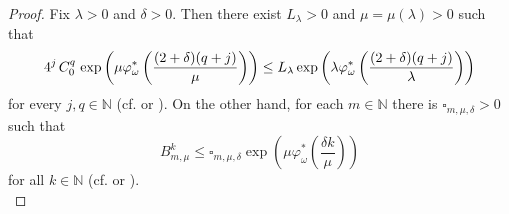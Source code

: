 \documentclass[12pt,reqno]{amsart} %
\numberwithin{equation}{section}
\begin{document}
\begin{proof}
	Fix $\lambda>0$ and $\delta>0$. Then there exist   $L_\lambda>0$ and  $\mu= \mu(\lambda)>0$ such that 
	\begin{equation*}
		4^j\hspace{0.05cm}  C_0^q\hspace{0.05cm}  \exp\left(\mu \varphi^*_\omega\left(\frac{(2+\delta)(q+j)}{\mu}\right)\right) \leq L_{\lambda} \exp\left(\lambda \varphi^*_\omega\left(\frac{(2+\delta)(q+j)}{\lambda}\right)\right)
	\end{equation*}
	for every $j,q\in \mathbb{N}$ (cf. \cite[Lemma 3.3]{jmaa} or \cite[Lemma A.1]{paley}). On the other hand, 
	for each $m\in\mathbb{N}$ there is $\square_{m,\mu,\delta}>0$ such that \begin{equation*}
		B_{m,\mu}^k\leq \square_{m,\mu,\delta} \exp\left(\mu \varphi^*_\omega\left(\frac{\delta k}{\mu}\right)\right)
	\end{equation*} 
	for all $k\in\mathbb{N}$ (cf. \cite[Lemma 3.3]{jmaa} or \cite[Lemma A.1]{paley}). \\
	

\end{proof}
\end{document}

